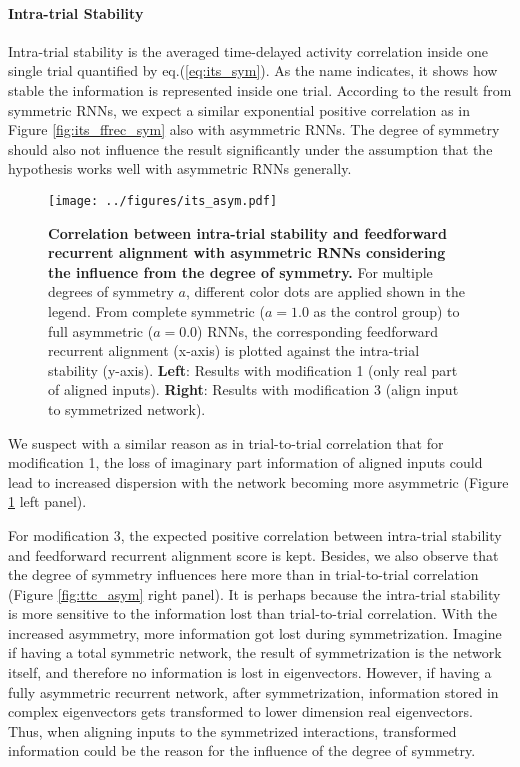 \documentclass[11pt]{article}
\begin{document}
	\paragraph{Intra-trial Stability}
	
	Intra-trial stability is the averaged time-delayed activity correlation inside one single trial quantified by eq.(\ref{eq:its_sym}). As the name indicates, it shows how stable the information is represented inside one trial. According to the result from symmetric RNNs, we expect a similar exponential positive correlation as in Figure \ref{fig:its_ffrec_sym} also with asymmetric RNNs. The degree of symmetry should also not influence the result significantly under the assumption that the hypothesis works well with asymmetric RNNs generally.
		\begin{figure}[H]
			\centering
			\texttt{[image: ../figures/its\_asym.pdf]}
			\caption[Correlation between intra-trial stability and feedforward recurrent alignment with asymmetric RNNs considering the influence from the degree of symmetry]{\textbf{Correlation between intra-trial stability and feedforward recurrent alignment with asymmetric RNNs considering the influence from the degree of symmetry.} For multiple degrees of symmetry $a$, different color dots are applied shown in the legend. From complete symmetric ($a = 1.0$ as the control group) to full asymmetric ($a = 0.0$) RNNs, the corresponding feedforward recurrent alignment (x-axis) is plotted against the intra-trial stability (y-axis). \textbf{Left}: Results with modification 1 (only real part of aligned inputs). \textbf{Right}: Results with modification 3 (align input to symmetrized network).}
			\label{fig:its_asym}
		\end{figure}
	We suspect with a similar reason as in trial-to-trial correlation that for modification 1, the loss of imaginary part information of aligned inputs could lead to increased dispersion with the network becoming more asymmetric (Figure \ref{fig:its_asym} left panel). 
	
	For modification 3, the expected positive correlation between intra-trial stability and feedforward recurrent alignment score is kept. Besides, we also observe that the degree of symmetry influences here more than in trial-to-trial correlation (Figure \ref{fig:ttc_asym} right panel). It is perhaps because the intra-trial stability is more sensitive to the information lost than trial-to-trial correlation. With the increased asymmetry, more information got lost during symmetrization. Imagine if having a total symmetric network, the result of symmetrization is the network itself, and therefore no information is lost in eigenvectors. However, if having a fully asymmetric recurrent network, after symmetrization, information stored in complex eigenvectors gets transformed to lower dimension real eigenvectors. Thus, when aligning inputs to the symmetrized interactions, transformed information could be the reason for the influence of the degree of symmetry. 
	\vspace{0.5cm}
\end{document}
